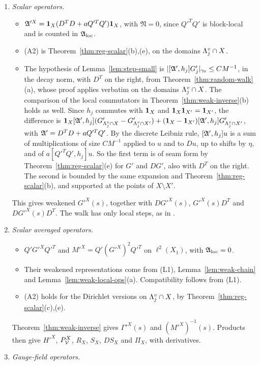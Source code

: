 \begin{enumerate}[label=(L\arabic*)]
\item \emph{Scalar operators.}
  \begin{itemize}
  \item $\mathfrak A'^X=\mathbf 1_X(D^TD+aQ'^TQ')\mathbf 1_X$, with $\mathfrak N=0$, since $Q'^TQ'$ is block-local and is counted in $\mathfrak A_{\rm loc}$.
  \item (A2) is Theorem~\ref{thm:reg-scalar}(b),(e), on the domains $\Lambda^v_j\cap X$.
  \item The hypothesis of Lemma~\ref{lem:step-small} is $|[\mathfrak A',h_j]G'_j|_{\gamma_0}\le CM^{-1}$, in the decay norm, with $D^T$ on the right, from Theorem~\ref{thm:random-walk}(a), whose proof applies verbatim on the domains $\Lambda^v_j\cap X$. The comparison of the local commutators in Theorem~\ref{thm:weak-inverse}(b) holds as well. Since $h_j$ commutes with $\mathbf 1_X$ and $\mathbf 1_X\mathbf 1_{X'}=\mathbf 1_{X'}$, the difference is $\mathbf 1_X[\mathfrak A',h_j](G'_{\Lambda^v_j\cap X}-G'_{\Lambda^v_j\cap X'})+(\mathbf 1_X-\mathbf 1_{X'})[\mathfrak A',h_j]G'_{\Lambda^v_j\cap X'}$, with $\mathfrak A'=D^TD+aQ'^TQ'$. By the discrete Leibniz rule, $[\mathfrak A',h_j]u$ is a sum of multiplications of size $CM^{-1}$ applied to $u$ and to $Du$, up to shifts by $\eta$, and of $a[Q'^TQ',h_j]u$. So the first term is of seam form by Theorem~\ref{thm:reg-scalar}(e) for $G'$ and $DG'$, also with $D^T$ on the right. The second is bounded by the same expansion and Theorem~\ref{thm:reg-scalar}(b), and supported at the points of $X\setminus X'$.
  \end{itemize}
  This gives weakened $G'^X(s)$, together with $DG'^X(s)$, $G'^X(s)D^T$ and $DG'^X(s)D^T$. The walk has only local steps, as in \cite[Lemma~6]{DimockI}.
\item \emph{Scalar averaged operators.}
  \begin{itemize}
  \item $Q'G'^XQ'^T$ and $M'^X=Q'(G'^X)^2Q'^T$ on $\ell^2(X_1)$, with $\mathfrak A_{\rm loc}=0$.
  \item Their weakened representations come from (L1), Lemma~\ref{lem:weak-chain} and Lemma~\ref{lem:weak-local-ops}(a). Compatibility follows from (L1).
  \item (A2) holds for the Dirichlet versions on $\Lambda^v_j\cap X$, by Theorem~\ref{thm:reg-scalar}(c),(e).
  \end{itemize}
  Theorem~\ref{thm:weak-inverse} gives $\Gamma'^X(s)$ and $(M'^X)^{-1}(s)$. Products then give $H'^X$, $P^X_\mathcal V$, $R_X$, $S_X$, $DS_X$ and $\Pi_X$, with derivatives.
\item \emph{Gauge-field operators.}

\end{enumerate}
